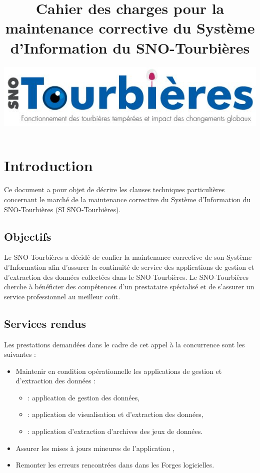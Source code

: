 \documentclass[]{article}
\title{Cahier des charges pour la maintenance corrective du Système d'Information du SNO-Tourbières}
\author{
	\includegraphics[scale=0.3]{logo_Tourbieres.jpg}\\[1cm]
}
\newcommand{\mhref}[3][blue]{\href{#2}{\color{#1}{#3}}}%
\newcommand{\SNOT}{{SNO-Tourbières}}
\newcommand{\datasnot}{{\mhref{https://data-snot.cnrs.fr/}{data-snot}}}
\newcommand{\dataaccess}{{\mhref{https://data-snot.cnrs.fr/data-access/}{data-access}}}
\newcommand{\dataarchive}{{\mhref{https://data-snot.cnrs.fr/dataset-archive/}{dataset-archive}}}
\begin{document}
\maketitle

\section{Introduction}

Ce document a pour objet de décrire les clauses techniques particulières concernant le marché de la maintenance corrective du Système d'Information du \SNOT{} (SI \SNOT).

\subsection{Objectifs}

Le \SNOT{} a décidé de confier la maintenance corrective de son Système d'Information afin d'assurer la continuité de service des applications de gestion et d'extraction des données collectées dans le \SNOT. Le \SNOT{} cherche à bénéficier des compétences d'un prestataire spécialisé et de s'assurer un service professionnel au meilleur coût.

\subsection{Services rendus}

Les prestations demandées dans le cadre de cet appel à la concurrence sont les suivantes : 

\begin{itemize}
	\item Maintenir en condition opérationnelle les applications de gestion et d'extraction des données : 
		\begin{itemize}
			\item \datasnot : application de gestion des données,
			\item \dataaccess : application de visualisation et d'extraction des données,
			\item \dataarchive : application d'extraction d'archives des jeux de données.
		\end{itemize}
	\item Assurer les mises à jours mineures de l'application \datasnot,
	\item Remonter les erreurs rencontrées dans \datasnot{} dans les Forges logicielles.\\
\end{itemize}
\end{document}
